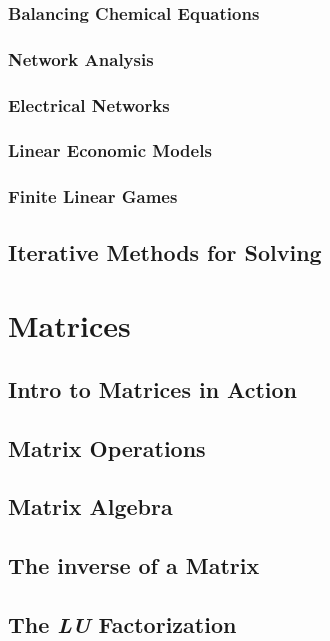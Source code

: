 \documentclass{article}
\begin{document}
		\subsubsection{Balancing Chemical Equations}
		\subsubsection{Network Analysis}
		\subsubsection{Electrical Networks}
		\subsubsection{Linear Economic Models}
		\subsubsection{Finite Linear Games}
	
	\subsection{Iterative Methods for Solving}

\clearpage
\section{Matrices} %

	\subsection{Intro to Matrices in Action}
	
	\subsection{Matrix Operations}
	
	\subsection{Matrix Algebra}
	
	\subsection{The inverse of a Matrix}
	
	\subsection{The \textit{LU} Factorization}
	
\end{document}
